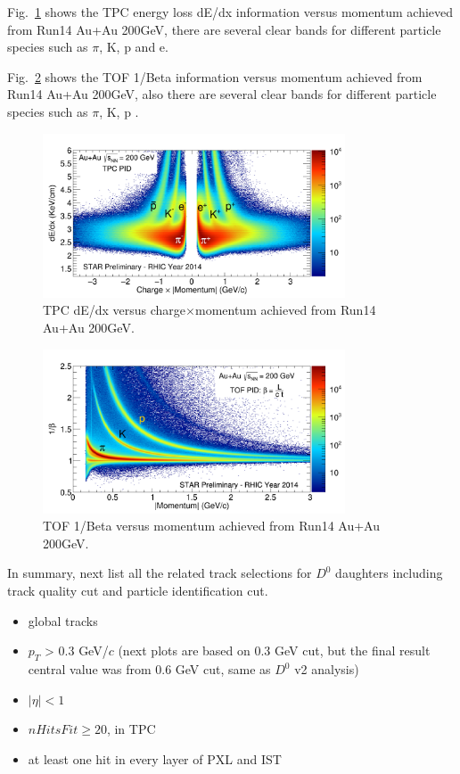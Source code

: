 Fig.~\ref{fig:tpcPID} shows the TPC energy loss dE/dx information versus momentum achieved from Run14 Au+Au 200GeV, there are several clear bands for different particle species such as $\pi$, K, p and e. 

Fig.~\ref{fig:tofPID} shows the TOF 1/Beta information versus momentum achieved from Run14 Au+Au 200GeV, also there are several clear bands for different particle species such as $\pi$, K, p . 

\begin{figure}[htbp]
\centering
\includegraphics[keepaspectratio,width=0.8\textwidth]{figure/Run14_D0HFT/Run14_AuAu_dEdx_PR_copy.png}
\caption{TPC dE/dx versus charge$\times$momentum achieved from Run14 Au+Au 200GeV.}
 \label{fig:tpcPID}
\end{figure}

\begin{figure}[htbp]
\centering
\includegraphics[keepaspectratio,width=0.8\textwidth]{figure/Run14_D0HFT/Run14_AuAu_tofBeta_PR.png}
\caption{TOF 1/Beta versus momentum achieved from Run14 Au+Au 200GeV.}
 \label{fig:tofPID}
\end{figure}

In summary, next list all the related track selections for $D^0$ daughters including track quality cut and particle identification cut.
\begin{itemize}
\item global tracks
\item $p_{T}$ > 0.3 GeV/$c$ (next plots are based on 0.3 GeV cut, but the final result central value was from 0.6 GeV cut, same as $D^0$ v2 analysis)
\item $|\eta| < 1$
\item $nHitsFit \ge 20$, in TPC
\item at least one hit in every layer of PXL and IST
\end{itemize}

